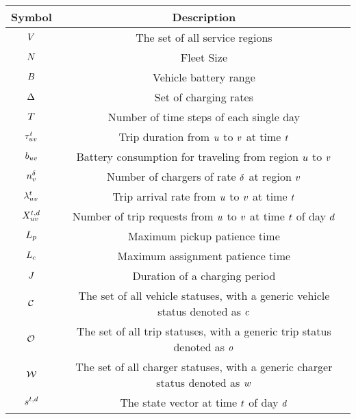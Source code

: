 \begin{table}[htb]
    \centering
    \begin{tabular}{|c|c|}
        \hline
        Symbol & Description \\
        \hline
        $V$ & The set of all service regions\\
        $N$ & Fleet Size \\
        $B$ & Vehicle battery range\\
        $\Delta$ & Set of charging rates\\
        $T$ & Number of time steps of each single day\\
        \hline
        $\tau_{uv}^{t}$ & Trip duration from $u$ to $v$ at time $t$\\
        $b_{uv}$ & Battery consumption for traveling from region $u$ to $v$\\
        $n_{v}^{\delta}$ & Number of chargers of rate $\delta$ at region $v$ \\
        \hline
        $\lambda_{uv}^{t}$ & Trip arrival rate from $u$ to $v$ at time $t$\\
        $X_{uv}^{t,d}$ & Number of trip requests from $u$ to $v$ at time $t$ of day $d$\\
        $L_p$ & Maximum pickup patience time\\
        $L_c$ & Maximum assignment patience time\\
        $J$ & Duration of a charging period\\
        \hline
        $\mathcal{C}$ & The set of all vehicle statuses, with a generic vehicle status denoted as $c_{}$\\
        $\mathcal{O}$ & The set of all trip statuses, with a generic trip status denoted as $o_{}$\\
        $\mathcal{W}$ & The set of all charger statuses, with a generic charger status denoted as $w_{}$\\
        \hline
        $s_{}^{t, d}$ & The state vector at time $t$ of day $d$\\

\end{tabular}
\end{table}
